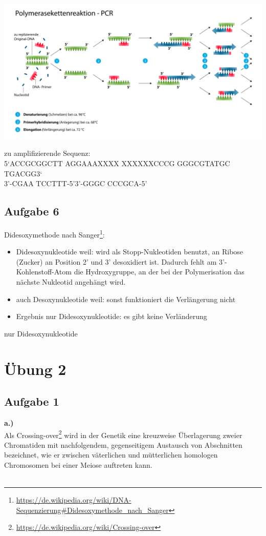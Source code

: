 \documentclass[13pt,a4paper]{article}
\begin{document}
\includegraphics[width=1\textwidth]{1024px-Polymerasekettenreaktion.png}

zu amplifizierende Sequenz:\\
5‘ACCGCGGCTT AGGAAAXXXX XXXXXXCCCG GGGCGTATGC TGACGG3‘\\
\noindent\hspace*{17mm}3'-CGAA TCCTTT-5'\hspace*{23mm}3'-GGGC CCCGCA-5'

\subsection{Aufgabe 6}
Didesoxymethode nach Sanger\footnote{\url{https://de.wikipedia.org/wiki/DNA-Sequenzierung\#Didesoxymethode_nach_Sanger}}:
\begin{itemize}
	\item Didesoxynukleotide weil: wird als Stopp-Nukleotiden benutzt, an Ribose (Zucker) an Position 2' und 3' desoxidiert ist. Dadurch fehlt am 3'-Kohlenstoff-Atom die Hydroxygruppe, an der bei der Polymerisation das nächste Nukleotid angehängt wird.
	\item auch Desoxynukleotide weil: sonst funktioniert die Verlängerung nicht
	\item Ergebnis nur Didesoxynukleotide: es gibt keine Verländerung
\end{itemize}
nur Didesoxynukleotide

\newpage
\section{Übung 2}

\subsection{Aufgabe 1}
\textbf{a.)}\\
Als Crossing-over\footnote{\url{https://de.wikipedia.org/wiki/Crossing-over}} wird in der Genetik eine kreuzweise Überlagerung zweier Chromatiden mit nachfolgendem, gegenseitigem Austausch von Abschnitten bezeichnet, wie er zwischen väterlichen und mütterlichen homologen Chromosomen bei einer Meiose auftreten kann.
\\\\
\end{document}
